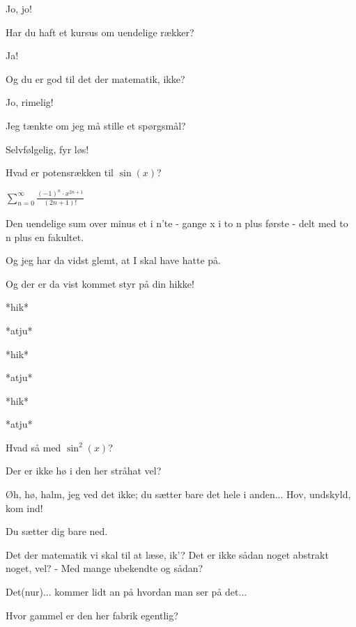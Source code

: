 \documentclass[a4paper,11pt]{article}
\begin{document}
\begin{sketch}
 Jo, jo!

 Har du haft et kursus om uendelige rækker?

 Ja!

 Og du er god til det der matematik, ikke?

 Jo, rimelig!

 Jeg tænkte om jeg må stille et spørgsmål?

 Selvfølgelig, fyr løs!

 Hvad er potensrækken til $\sin(x)$?


 $\sum_{n=0}^\infty \frac{(-1)^n\cdot x^{2n+1}}{(2n+1)!}$

 Den uendelige sum over minus et i n'te - gange x i to n plus første - delt med to n plus en fakultet.

 Og jeg har da vidst glemt, at I skal have hatte på.


 Og der er da vist kommet styr på din hikke!

 *hik*

 *atju*

 *hik*

 *atju*

 *hik*

 *atju*

 Hvad så med $\sin^2(x)$?

 Der er ikke hø i den her stråhat vel?


 Øh, hø, halm, jeg ved det ikke; du sætter bare det hele i anden... Hov, undskyld, kom ind!

 Du sætter dig bare ned.

 Det der matematik vi skal til at læse, ik’? Det er ikke sådan noget abstrakt noget, vel? - Med mange ubekendte og sådan?


 Det(nur)... kommer lidt an på hvordan man ser på det...


 Hvor gammel er den her fabrik egentlig?


\end{sketch}
\end{document}
